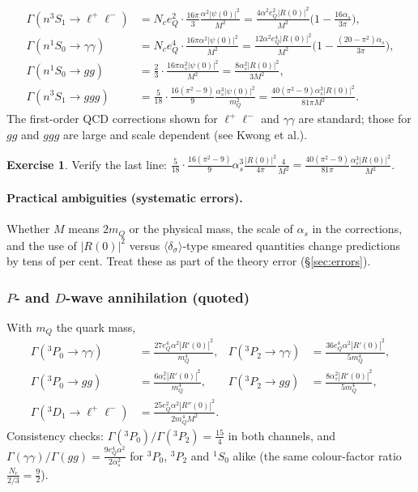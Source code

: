 \documentclass[11pt,a4paper]{article}
\numberwithin{equation}{section}
\theoremstyle{definition}
\newtheorem{exercise}[definition]{Exercise}
\theoremstyle{plain}
\theoremstyle{remark}
\newenvironment{keyresult}[1][Key result]{\begin{tcolorbox}[keybox,title={\small\bfseries #1},fonttitle=\small,coltitle=white,colbacktitle=MidnightBlue!70]}{\end{tcolorbox}}
\numberwithin{algorithm}{section}
\newcommand{\as}{\alpha_s}
\begin{document}
\begin{keyresult}[$S$-wave annihilation widths (leading order; $M=2m_Q$ in the derivation)]
\begin{align}
\Gamma(n^3S_1\to\ell^+\ell^-)&=N_ce_Q^2\cdot\frac{16\pi}{3}\frac{\alpha^2|\psi(0)|^2}{M^2}=\frac{4\alpha^2e_Q^2|R(0)|^2}{M^2}\Big(1-\frac{16\as}{3\pi}\Big),\\
\Gamma(n^1S_0\to\gamma\gamma)&=N_ce_Q^4\cdot\frac{16\pi\alpha^2|\psi(0)|^2}{M^2}=\frac{12\alpha^2e_Q^4|R(0)|^2}{M^2}\Big(1-\frac{(20-\pi^2)\as}{3\pi}\Big),\\
\Gamma(n^1S_0\to gg)&=\frac23\cdot\frac{16\pi\as^2|\psi(0)|^2}{M^2}=\frac{8\as^2|R(0)|^2}{3M^2},\\
\Gamma(n^3S_1\to ggg)&=\frac5{18}\cdot\frac{16(\pi^2-9)}{9}\frac{\as^3|\psi(0)|^2}{m_Q^2}=\frac{40(\pi^2-9)\as^3|R(0)|^2}{81\pi M^2}.
\end{align}
The first-order QCD corrections shown for $\ell^+\ell^-$ and $\gamma\gamma$ are standard; those for $gg$ and $ggg$ are large and scale dependent (see Kwong et al.).
\end{keyresult}
\begin{exercise}
Verify the last line: $\frac5{18}\cdot\frac{16(\pi^2-9)}9\as^3\frac{|R(0)|^2}{4\pi}\frac{4}{M^2}=\frac{40(\pi^2-9)}{81\pi}\frac{\as^3|R(0)|^2}{M^2}$.
\end{exercise}
\paragraph{Practical ambiguities (systematic errors).} Whether $M$ means $2m_Q$ or the physical mass, the scale of $\as$ in the corrections, and the use of $|R(0)|^2$ versus $\langle\delta_\sigma\rangle$-type smeared quantities change predictions by tens of per cent. Treat these as part of the theory error (\S\ref{sec:errors}).

\subsubsection{\texorpdfstring{$P$- and $D$-wave annihilation (quoted)}{P- and D-wave annihilation (quoted)}}
With $m_Q$ the quark mass,
\begin{align}
\Gamma({}^3P_0\to\gamma\gamma)&=\frac{27e_Q^4\alpha^2|R'(0)|^2}{m_Q^4},&\Gamma({}^3P_2\to\gamma\gamma)&=\frac{36e_Q^4\alpha^2|R'(0)|^2}{5m_Q^4},\\
\Gamma({}^3P_0\to gg)&=\frac{6\as^2|R'(0)|^2}{m_Q^4},&\Gamma({}^3P_2\to gg)&=\frac{8\as^2|R'(0)|^2}{5m_Q^4},\\
\Gamma({}^3D_1\to\ell^+\ell^-)&=\frac{25e_Q^2\alpha^2|R''(0)|^2}{2m_Q^4M^2}.
\end{align}
Consistency checks: $\Gamma({}^3P_0)/\Gamma({}^3P_2)=\frac{15}{4}$ in both channels, and $\Gamma(\gamma\gamma)/\Gamma(gg)=\frac{9e_Q^4\alpha^2}{2\as^2}$ for ${}^3P_0$, ${}^3P_2$ and ${}^1S_0$ alike (the same colour-factor ratio $\frac{N_c}{2/3}=\frac92$).
\end{document}
